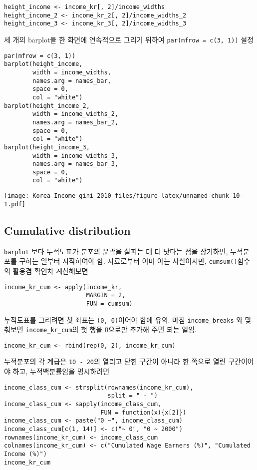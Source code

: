 \documentclass[
]{article}
\begin{document}
\begin{verbatim}
height_income <- income_kr[, 2]/income_widths
height_income_2 <- income_kr_2[, 2]/income_widths_2
height_income_3 <- income_kr_3[, 2]/income_widths_3
\end{verbatim}

세 개의 barplot을 한 화면에 연속적으로 그리기 위하여
\texttt{par(mfrow\ =\ c(3,\ 1))} 설정

\begin{verbatim}
par(mfrow = c(3, 1))
barplot(height_income, 
        width = income_widths, 
        names.arg = names_bar, 
        space = 0, 
        col = "white")
barplot(height_income_2, 
        width = income_widths_2, 
        names.arg = names_bar_2, 
        space = 0, 
        col = "white")
barplot(height_income_3, 
        width = income_widths_3, 
        names.arg = names_bar_3, 
        space = 0, 
        col = "white")
\end{verbatim}

\texttt{[image: Korea\_Income\_gini\_2010\_files/figure-latex/unnamed-chunk-10-1.pdf]}

\hypertarget{cumulative-distribution}{%
\subsection{Cumulative distribution}\label{cumulative-distribution}}

\texttt{barplot} 보다 누적도표가 분포의 윤곽을 살피는 데 더 낫다는 점을
상기하면, 누적분포를 구하는 일부터 시작하여야 함. 자료로부터 이미 아는
사실이지만, \texttt{cumsum()}함수의 활용겸 확인차 계산해보면

\begin{verbatim}
income_kr_cum <- apply(income_kr, 
                       MARGIN = 2, 
                       FUN = cumsum)
\end{verbatim}

누적도표를 그리려면 첫 좌표는 \texttt{(0,\ 0)}이어야 함에 유의. 마침
\texttt{income\_breaks} 와 맞춰보면 \texttt{income\_kr\_cum}의 첫 행을
0으로만 추가해 주면 되는 일임.

\begin{verbatim}
income_kr_cum <- rbind(rep(0, 2), income_kr_cum)
\end{verbatim}

누적분포의 각 계급은 \texttt{10\ -\ 20}의 열리고 닫힌 구간이 아니라 한
쪽으로 열린 구간이어야 하고, 누적백분률임을 명시하려면

\begin{verbatim}
income_class_cum <- strsplit(rownames(income_kr_cum), 
                             split = " - ")
income_class_cum <- sapply(income_class_cum, 
                           FUN = function(x){x[2]})
income_class_cum <- paste("0 ~", income_class_cum)
income_class_cum[c(1, 14)] <- c("~ 0", "0 ~ 2000")
rownames(income_kr_cum) <- income_class_cum
colnames(income_kr_cum) <- c("Cumulated Wage Earners (%)", "Cumulated Income (%)")
income_kr_cum
\end{verbatim}
\end{document}
